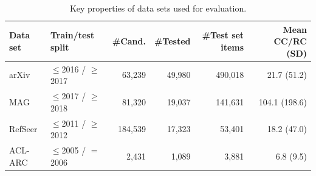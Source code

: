 


\begin{table}[b]
\centering
    \caption{Key properties of data sets used for evaluation.}
    \label{tab:datasetprops}
\begin{center}
    \begin{tabular}{llrrrr}
    \toprule %
    Data set & Train/test split & \#Cand. & \#Tested & \#Test set items & Mean CC/RC (SD)\\ 
    \midrule
    arXiv & $\le$2016 / $\ge$2017 & 63,239 & 49,980 & 490,018 & 21.7 (\hphantom{1}51.2) \\
    MAG & $\le$2017 / $\ge$2018 & 81,320 & 19,037 & 141,631 & 104.1 (198.6) \\
    RefSeer & $\le$2011 / $\ge$2012 & 184,539 & 17,323 & 53,401 & 18.2 (\hphantom{1}47.0)\\
    ACL-ARC & $\le$2005 / $=$2006 & 2,431 & 1,089 & 3,881 & \hphantom{1}6.8 (\hphantom{10}9.5) \\
    \bottomrule
    \end{tabular}
\end{center}
\end{table}

